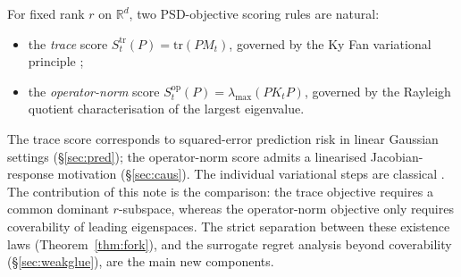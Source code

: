 \documentclass[final,3p,times]{elsarticle}
\newcommand{\tr}{\mathrm{tr}}
\newcommand{\R}{\mathbb{R}}
\begin{document}
For fixed rank $r$ on $\R^d$, two PSD-objective scoring rules are
natural:
\begin{itemize}
\item the \emph{trace} score $S^{\mathrm{tr}}_t(P)=\tr(PM_t)$, governed
by the Ky Fan variational principle \cite{Fan1949};
\item the \emph{operator-norm} score $S^{\mathrm{op}}_t(P)
=\lambda_{\max}(PK_tP)$, governed by the Rayleigh quotient
characterisation of the largest eigenvalue.
\end{itemize}
The trace score corresponds to squared-error prediction risk in linear
Gaussian settings (\S\ref{sec:pred}); the operator-norm score admits a
linearised Jacobian-response motivation (\S\ref{sec:caus}).
The individual variational steps are classical
\cite{Fan1949,HornJohnson2013}.
The contribution of this note is the comparison: the trace objective
requires a common dominant $r$-subspace, whereas the operator-norm
objective only requires coverability of leading eigenspaces.
The strict separation between these existence laws
(Theorem~\ref{thm:fork}), and the surrogate regret analysis beyond
coverability (\S\ref{sec:weakglue}), are the main new components.
\end{document}
